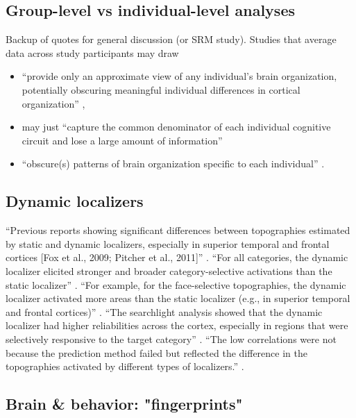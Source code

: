 \subsection{Group-level vs individual-level analyses}

Backup of quotes for general discussion (or SRM study).  Studies that average
data across study participants may draw

\begin{itemize}

\item ``provide only an approximate view of any individual's brain organization,
    potentially obscuring meaningful individual differences in cortical
        organization'' \citep{laumann2015functional},

\item may just ``capture the common denominator of each individual cognitive
    circuit and lose a large amount of information''

\item ``obscure(s) patterns of brain organization specific to each individual''
    \citep{laumann2015functional}.

\end{itemize}


\subsection{Dynamic localizers}
%
``Previous reports showing significant differences between topographies
estimated by static and dynamic localizers, especially in superior temporal and
frontal cortices [Fox et al., 2009; Pitcher et al., 2011]''
\citep{jiahui2022cross}.
%
``For all categories, the dynamic localizer elicited stronger and broader
category-selective activations than the static localizer''
\citep{jiahui2022cross}.
%
``For example, for the face-selective topographies, the dynamic localizer
activated more areas than the static localizer (e.g., in superior temporal and
frontal cortices)'' \citep{jiahui2022cross}.
%
``The searchlight analysis showed that the dynamic localizer had higher
reliabilities across the cortex, especially in regions that were selectively
responsive to the target category'' \citep{jiahui2022cross}.
%
``The low correlations were not because the prediction method failed but
reflected the difference in the topographies activated by different types of
localizers.'' \citep{jiahui2022cross}.


\subsection{Brain \& behavior: "fingerprints"}

